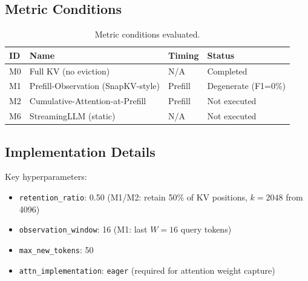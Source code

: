 \subsection{Metric Conditions}

\begin{table}[h]
\centering
\caption{Metric conditions evaluated.}
\label{tab:conditions}
\begin{tabular}{llll}
\toprule
ID & Name & Timing & Status \\
\midrule
M0 & Full KV (no eviction) & N/A & Completed \\
M1 & Prefill-Observation (SnapKV-style) & Prefill & Degenerate (F1=0\%) \\
M2 & Cumulative-Attention-at-Prefill & Prefill & Not executed \\
M6 & StreamingLLM (static) & N/A & Not executed \\
\bottomrule
\end{tabular}
\end{table}

\subsection{Implementation Details}

Key hyperparameters:
\begin{itemize}
\item \texttt{retention\_ratio}: 0.50 (M1/M2: retain 50\% of KV positions, $k=2048$ from 4096)
\item \texttt{observation\_window}: 16 (M1: last $W=16$ query tokens)
\item \texttt{max\_new\_tokens}: 50
\item \texttt{attn\_implementation}: \texttt{eager} (required for attention weight capture)
\end{itemize}
